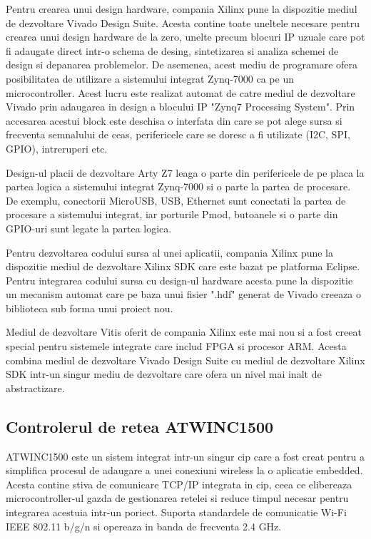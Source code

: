Pentru crearea unui design hardware, compania Xilinx pune la dispozitie mediul de dezvoltare Vivado Design Suite. Acesta contine toate uneltele necesare pentru 
crearea unui design hardware de la zero, unelte precum blocuri IP uzuale care pot fi adaugate direct intr-o schema de desing, sintetizarea si analiza schemei de 
design si depanarea problemelor. De asemenea, acest mediu de programare ofera posibilitatea de utilizare a sistemului integrat Zynq-7000 ca pe un microcontroller. 
Acest lucru este realizat automat de catre mediul de dezvoltare Vivado prin adaugarea in design a blocului IP "Zynq7 Processing System". Prin accesarea acestui block 
este deschisa o interfata din care se pot alege sursa si frecventa semnalului de ceas, perifericele care se doresc a fi utilizate (I2C, SPI, GPIO), intreruperi etc.

Design-ul placii de dezvoltare Arty Z7 leaga o parte din perifericele de pe placa la partea logica a sistemului integrat Zynq-7000 si o parte la partea de procesare. 
De exemplu, conectorii MicroUSB, USB, Ethernet sunt conectati la partea de procesare a sistemului integrat, iar porturile Pmod, butoanele si o parte din GPIO-uri sunt 
legate la partea logica.

Pentru dezvoltarea codului sursa al unei aplicatii, compania Xilinx pune la dispozitie mediul de dezvoltare Xilinx SDK care este bazat pe platforma Eclipse. Pentru 
integrarea codului sursa cu design-ul hardware acesta pune la dispozitie un mecanism automat care pe baza unui fisier ".hdf" generat de Vivado creeaza o biblioteca sub 
forma unui proiect nou.

Mediul de dezvoltare Vitis oferit de compania Xilinx este mai nou si a fost creeat special pentru sistemele integrate care includ FPGA si procesor ARM. Acesta combina 
mediul de dezvoltare Vivado Design Suite cu mediul de dezvoltare Xilinx SDK intr-un singur mediu de dezvoltare care ofera un nivel mai inalt de abstractizare.

\subsection{Controlerul de retea ATWINC1500}\label{subsec:af_atwinc}
ATWINC1500 este un sistem integrat intr-un singur cip care a fost creat pentru a simplifica procesul de adaugare a unei conexiuni wireless la o aplicatie embedded. 
Acesta contine stiva de comunicare TCP/IP integrata in cip, ceea ce elibereaza microcontroller-ul gazda de gestionarea retelei si reduce timpul necesar pentru integrarea 
acestuia intr-un poriect. Suporta standardele de comunicatie Wi-Fi IEEE 802.11 b/g/n si opereaza in banda de frecventa 2.4 GHz.

